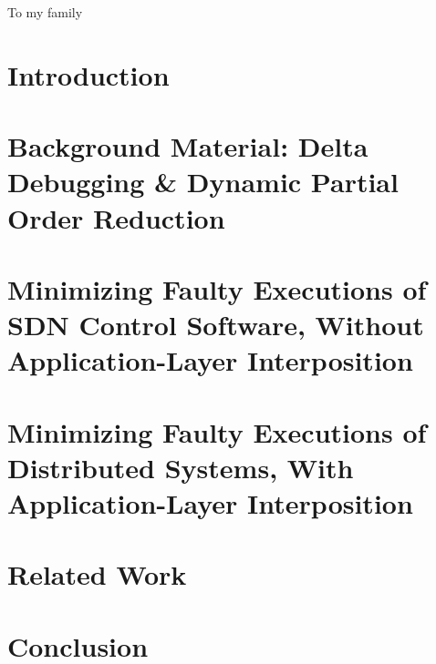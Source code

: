 

\begin{abstract}

\end{abstract}

\begin{frontmatter}

\begin{dedication}
\null\vfil
{\large
\begin{center}
To my family
\end{center}}
\null\vfil
\end{dedication}

\tableofcontents
\listoffigures %
\listoftables %



\end{frontmatter}

\chapter{Introduction}
\label{sec:intro}


\chapter{Background Material: Delta Debugging \& Dynamic Partial Order
Reduction}
\label{sec:background_material}


\chapter{Minimizing Faulty Executions of SDN Control Software, Without Application-Layer Interposition}
\label{sec:sts}


\chapter{Minimizing Faulty Executions of Distributed Systems, With Application-Layer Interposition}
\label{sec:demi}


\chapter{Related Work}
\label{sec:related_work}


\chapter{Conclusion}
\label{main_sec:conclusion}


%

%


\printbibliography


